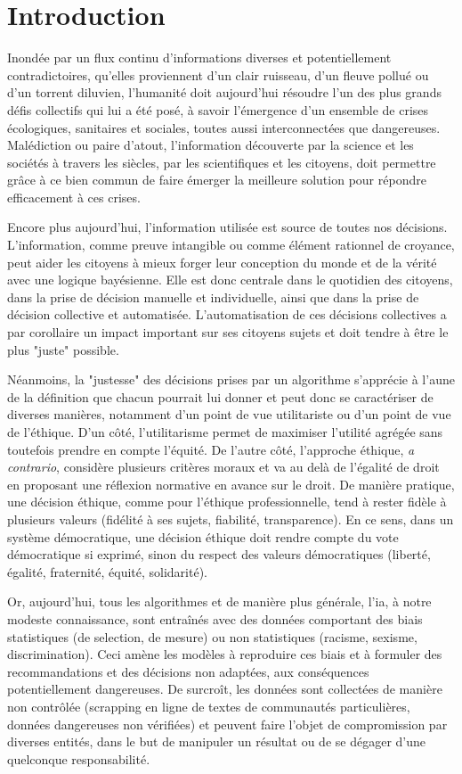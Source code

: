 \section{Introduction}

Inondée par un flux continu d'informations diverses et potentiellement contradictoires, qu'elles proviennent d'un clair ruisseau, d'un fleuve pollué ou d'un torrent diluvien, l'humanité doit aujourd'hui résoudre l'un des plus grands défis collectifs qui lui a été posé, à savoir l'émergence d'un ensemble de crises écologiques, sanitaires et sociales, toutes aussi interconnectées que dangereuses. Malédiction ou paire d'atout, l'information découverte par la science et les sociétés à travers les siècles, par les scientifiques et les citoyens, doit permettre grâce à ce bien commun de faire émerger la meilleure solution pour répondre efficacement à ces crises. 

Encore plus aujourd'hui, l'information utilisée est source de toutes nos décisions. L'information, comme preuve intangible ou comme élément rationnel de croyance, peut aider les citoyens à mieux forger leur conception du monde et de la vérité avec une logique bayésienne. Elle est donc centrale dans le quotidien des citoyens, dans la prise de décision manuelle et individuelle, ainsi que dans la prise de décision collective et automatisée. L'automatisation de ces décisions collectives a par corollaire un impact important sur ses citoyens sujets et doit tendre à être le plus "juste" possible.

Néanmoins, la "justesse" des décisions prises par un algorithme s'apprécie à l'aune de la définition que chacun pourrait lui donner et peut donc se caractériser de diverses manières, notamment d'un point de vue utilitariste ou d'un point de vue de l'éthique. D'un côté, l'utilitarisme permet de maximiser l'utilité agrégée sans toutefois prendre en compte l'équité. De l'autre côté, l'approche éthique, \textit{a contrario}, considère plusieurs critères moraux et va au delà de l'égalité de droit en proposant une réflexion normative en avance sur le droit. De manière pratique, une décision éthique, comme pour l'éthique professionnelle, tend à rester fidèle à plusieurs valeurs (fidélité à ses sujets, fiabilité, transparence). En ce sens, dans un système démocratique, une décision éthique doit rendre compte du vote démocratique si exprimé, sinon du respect des valeurs démocratiques (liberté, égalité, fraternité, équité, solidarité).

Or, aujourd'hui, tous les algorithmes et de manière plus générale, l'\Gls{ia}, à notre modeste connaissance, sont entraînés avec des données comportant des biais statistiques (de selection, de mesure) ou non statistiques (racisme, sexisme, discrimination). Ceci amène les modèles à reproduire ces biais et à formuler des recommandations et des décisions non adaptées, aux conséquences potentiellement dangereuses. De surcroît, les données sont collectées de manière non contrôlée (scrapping en ligne de textes de communautés particulières, données dangereuses non vérifiées) et peuvent faire l'objet de compromission par diverses entités, dans le but de manipuler un résultat ou de se dégager d'une quelconque responsabilité.

